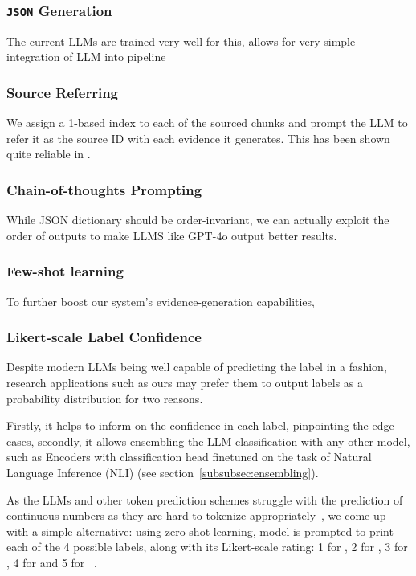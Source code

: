 \subsubsection{\texttt{JSON} Generation}
The current LLMs are trained very well for this, allows for very simple integration of LLM into pipeline

\subsubsection{Source Referring}
We assign a 1-based index to each of the sourced chunks and prompt the LLM to refer it as the source ID with each evidence it generates.
This has been shown quite reliable in .

\subsubsection{Chain-of-thoughts Prompting}
While JSON dictionary should be order-invariant, we can actually exploit the order of outputs to make LLMS like GPT-4o output better results.

\subsubsection{Few-shot learning}
To further boost our system's evidence-generation capabilities, 

\subsubsection{Likert-scale Label Confidence}
Despite modern LLMs being well capable of predicting the label in a  fashion, research applications such as ours may prefer them to output labels as a probability distribution for two reasons.

Firstly, it helps to inform on the confidence in each label, pinpointing the edge-cases, secondly, it allows ensembling the LLM classification with any other model, such as Encoders with classification head finetuned on the task of Natural Language Inference (NLI) (see section~\ref{subsubsec:ensembling}).

As the LLMs and other token prediction schemes struggle with the prediction of continuous numbers as they are hard to tokenize appropriately~\cite{golkar2023xvalcontinuousnumberencoding}, we come up with a simple alternative: using zero-shot learning, model is prompted to print each of the 4 possible labels, along with its Likert-scale rating: 1 for , 2 for , 3 for , 4 for  and 5 for ~\cite{likert1932technique}.

